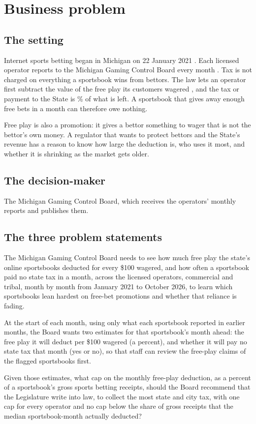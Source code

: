 \section{Business problem}

\subsection*{The setting}
Internet sports betting began in Michigan on 22 January 2021 \cite{mgcb_data}. Each licensed operator reports to the Michigan Gaming Control Board every month \cite{mcl_416a}. Tax is not charged on everything a sportsbook wins from bettors. The law lets an operator first subtract the value of the free play its customers wagered \cite{mcl_403}, and the tax or payment to the State is \% of what is left. A sportsbook that gives away enough free bets in a month can therefore owe nothing.

Free play is also a promotion: it gives a bettor something to wager that is not the bettor's own money. A regulator that wants to protect bettors and the State's revenue has a reason to know how large the deduction is, who uses it most, and whether it is shrinking as the market gets older.

\subsection*{The decision-maker}
The Michigan Gaming Control Board, which receives the operators' monthly reports and publishes them.

\subsection*{The three problem statements}
\begin{description}[leftmargin=1.2em,style=nextline]
\item[Descriptive] The Michigan Gaming Control Board needs to see how much free play the state's online sportsbooks deducted for every \$100 wagered, and how often a sportsbook paid no state tax in a month, across the  licensed operators, commercial and tribal, month by month from January 2021 to October 2026, to learn which sportsbooks lean hardest on free-bet promotions and whether that reliance is fading.
\item[Predictive] At the start of each month, using only what each sportsbook reported in earlier months, the Board wants two estimates for that sportsbook's month ahead: the free play it will deduct per \$100 wagered (a percent), and whether it will pay no state tax that month (yes or no), so that staff can review the free-play claims of the flagged sportsbooks first.
\item[Prescriptive] Given those estimates, what cap on the monthly free-play deduction, as a percent of a sportsbook's gross sports betting receipts, should the Board recommend that the Legislature write into law, to collect the most state and city tax, with one cap for every operator and no cap below the share of gross receipts that the median sportsbook-month actually deducted?
\end{description}

